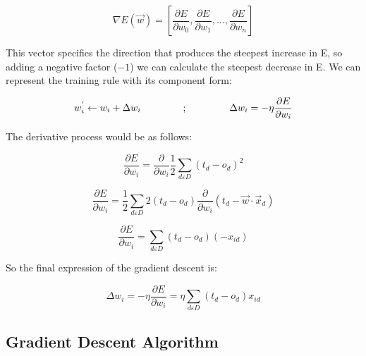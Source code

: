 	\begin{equation}
		\label{gradient_of_E}
		\nabla E(\vec{w})= [\frac{\partial{E}}{\partial{w_{0}}}, \frac{\partial{E}}{\partial{w_{1}}}, ..., \frac{\partial{E}}{\partial{w_{n}}}]
	\end{equation}

	This vector specifies the direction that produces the steepest increase in E, so adding a negative factor ($-1$) we can calculate the steepest decrease in E. We can represent the training rule with its component form:

	\begin{equation}
		\label{training_rule_component_form}
		w_{i}^{'} \leftarrow w_{i} + \Delta w_{i} \hspace{1.5cm} ; \hspace{1.5cm} \Delta{w_{i}}=-\eta \frac{\partial{E}}{\partial{w_i}}
	\end{equation}

	The derivative process would be as follows:

	\begin{equation}
		\label{derivating_error_function_1}
		\frac{\partial{E}}{\partial{w_i}} = \frac{\partial{}}{\partial{w_i}} \frac{1}{2} \sum_{d \varepsilon D} (t_d - o_d)^2
	\end{equation}

	\begin{equation}
		\label{derivating_error_function_2}
		\frac{\partial{E}}{\partial{w_i}}  = \frac{1}{2} \sum_{d \varepsilon D} 2(t_d - o_d) \frac{\partial{}}{\partial{w_i}} (t_d - \vec{w} \cdot \vec{x}_d)
	\end{equation}

	\begin{equation}
		\label{derivating_error_function_3}
		\frac{\partial{E}}{\partial{w_i}} = \sum_{d \varepsilon D} (t_d - o_d) (-x_{id})
	\end{equation}

	So the final expression of the gradient descent is:

	\begin{equation}
		\label{gradient_descent_final_expr}
		\Delta w_i = -\eta \frac{\partial{E}}{\partial{w_i}} = \eta \sum_{d \varepsilon D} (t_d - o_d) x_{id}
	\end{equation}


	\subsection{Gradient Descent Algorithm}

